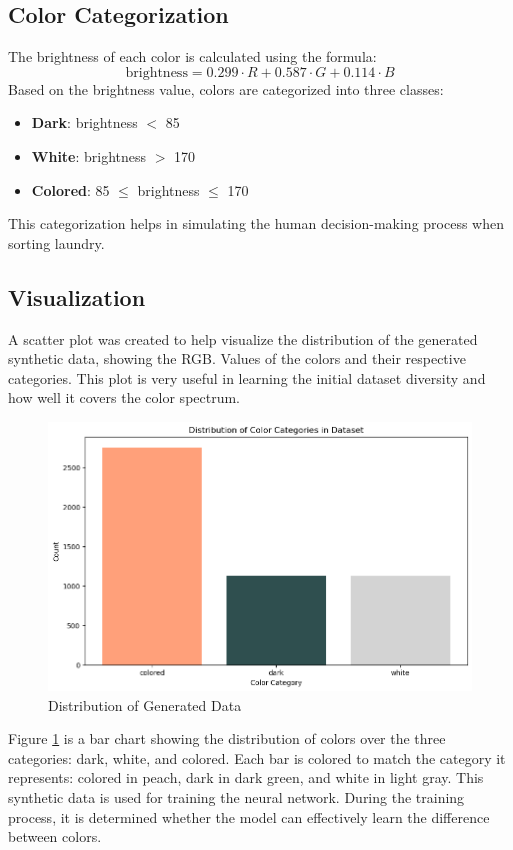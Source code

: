 \documentclass{article}
\begin{document}
\subsection{Color Categorization}
The brightness of each color is calculated using the formula:
\[ \text{brightness} = 0.299 \cdot R + 0.587 \cdot G + 0.114 \cdot B \]
Based on the brightness value, colors are categorized into three classes:
\begin{itemize}
    \item \textbf{Dark}: brightness $<$ 85
    \item \textbf{White}: brightness $>$ 170
    \item \textbf{Colored}: 85 $\leq$ brightness $\leq$ 170
\end{itemize}
This categorization helps in simulating the human decision-making process when sorting laundry.

\newpage

\subsection{Visualization}
A scatter plot was created to help visualize the distribution of the generated synthetic data, showing the RGB. Values of the colors and their respective categories. This plot is very useful in learning the initial dataset diversity and how well it covers the color spectrum.
\begin{figure}[H]
    \centering
    \includegraphics[width=\textwidth]{pictures/dis_out.png}
    \caption{Distribution of Generated Data}
    \label{fig:dis_out}
\end{figure}

Figure \ref{fig:dis_out} is a bar chart showing the distribution of colors over the three categories: dark, white, and colored. Each bar is colored to match the category it represents: colored in peach, dark in dark green, and white in light gray. This synthetic data is used for training the neural network. During the training process, it is determined whether the model can effectively learn the difference between colors.
\end{document}
